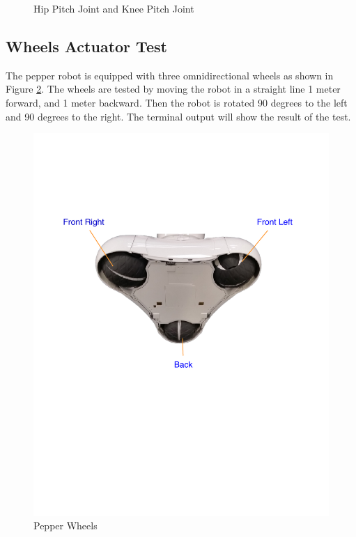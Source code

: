 \documentclass{CSSRforAfrica}
\begin{document}
\begin{figure}[!hbpt]
\begin{minipage}{0.45\textwidth}
        \caption{Hip Pitch Joint and Knee Pitch Joint \cite{PepperJoints}}
        \label{fig: Hip Pitch joint}
    \end{minipage}
\end{figure}

\newpage

\subsection{Wheels Actuator Test}
The pepper robot is equipped with three omnidirectional wheels as shown in Figure \ref{fig: Pepper Wheels}. 
The wheels are tested by moving the robot in a straight line 1 meter forward, and 1 meter backward. Then 
the robot is rotated 90 degrees to the left and 90 degrees to the right. The terminal output will show 
the result of the test.

\begin{figure}[!hbpt]
\centering
\includegraphics[scale=0.55]{images/Pepper_wheels.pdf}
\caption{Pepper Wheels}
\label{fig: Pepper Wheels}
\end{figure}
\end{document}
